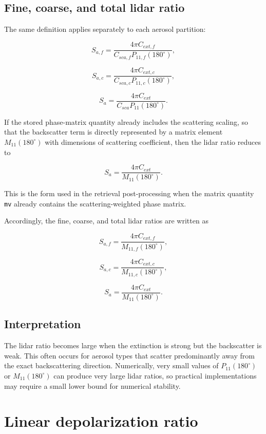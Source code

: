 \documentclass[
  letterpaper,
]{scrbook}
\begin{document}
\subsection{Fine, coarse, and total lidar
ratio}\label{fine-coarse-and-total-lidar-ratio}

The same definition applies separately to each aerosol partition:

\[
S_{a,f} = \frac{4\pi C_{ext,f}}{C_{sca,f} P_{11,f}(180^\circ)},
\]

\[
S_{a,c} = \frac{4\pi C_{ext,c}}{C_{sca,c} P_{11,c}(180^\circ)},
\]

\[
S_{a} = \frac{4\pi C_{ext}}{C_{sca} P_{11}(180^\circ)}.
\]

If the stored phase-matrix quantity already includes the scattering
scaling, so that the backscatter term is directly represented by a
matrix element \(M_{11}(180^\circ)\) with dimensions of scattering
coefficient, then the lidar ratio reduces to

\[
S_a = \frac{4\pi C_{ext}}{M_{11}(180^\circ)}.
\]

This is the form used in the retrieval post-processing when the matrix
quantity \texttt{mv} already contains the scattering-weighted phase
matrix.

Accordingly, the fine, coarse, and total lidar ratios are written as

\[
S_{a,f} = \frac{4\pi C_{ext,f}}{M_{11,f}(180^\circ)},
\]

\[
S_{a,c} = \frac{4\pi C_{ext,c}}{M_{11,c}(180^\circ)},
\]

\[
S_{a} = \frac{4\pi C_{ext}}{M_{11}(180^\circ)}.
\]

\subsection{Interpretation}\label{interpretation}

The lidar ratio becomes large when the extinction is strong but the
backscatter is weak. This often occurs for aerosol types that scatter
predominantly away from the exact backscattering direction. Numerically,
very small values of \(P_{11}(180^\circ)\) or \(M_{11}(180^\circ)\) can
produce very large lidar ratios, so practical implementations may
require a small lower bound for numerical stability.

\section{Linear depolarization ratio}\label{linear-depolarization-ratio}
\end{document}
